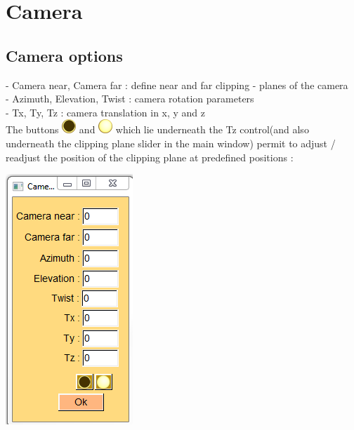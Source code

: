 \noindent
\begin{minipage}{0.55\textwidth}
\section{Camera}
\subsection{Camera options}


- Camera near, Camera far : define near and far clipping -
planes of the camera\\
- Azimuth, Elevation, Twist : camera rotation parameters\\
- Tx, Ty, Tz : camera translation in x, y and z\\

The buttons \includegraphics[scale=0.7]{images/pixmap/Clipping_plane_z0.png} and \includegraphics[scale=0.7]{images/pixmap/Clipping_plane_normal.png} which lie underneath the Tz control(and also underneath the clipping plane slider in the main window) permit to adjust / readjust the position of the clipping plane at predefined positions :\\

\end{minipage}  
 \begin{minipage}{0.45\textwidth}\centering
  \includegraphics[scale=0.5]{images/Icons/camera_options.png}

 \end{minipage} 
